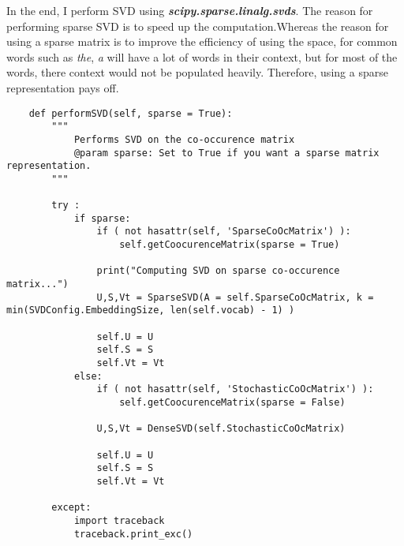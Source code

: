 In the end, I perform SVD using \textbf{\textit{scipy.sparse.linalg.svds}}. The reason for performing sparse SVD is to speed up the computation.Whereas the reason for using a sparse matrix is to improve the efficiency of using the space, for common words such as \textit{the}, \textit{a} will have a lot of words in their context, but for most of the words, there context would not be populated heavily. Therefore, using a sparse representation pays off.

\begin{lstlisting}
    def performSVD(self, sparse = True):
        """
            Performs SVD on the co-occurence matrix
            @param sparse: Set to True if you want a sparse matrix representation.
        """
        
        try :
            if sparse:
                if ( not hasattr(self, 'SparseCoOcMatrix') ):
                    self.getCoocurenceMatrix(sparse = True)
                
                print("Computing SVD on sparse co-occurence matrix...")
                U,S,Vt = SparseSVD(A = self.SparseCoOcMatrix, k = min(SVDConfig.EmbeddingSize, len(self.vocab) - 1) )

                self.U = U
                self.S = S
                self.Vt = Vt
            else:
                if ( not hasattr(self, 'StochasticCoOcMatrix') ):
                    self.getCoocurenceMatrix(sparse = False)
                
                U,S,Vt = DenseSVD(self.StochasticCoOcMatrix)
                
                self.U = U
                self.S = S
                self.Vt = Vt

        except:
            import traceback
            traceback.print_exc()
\end{lstlisting}
